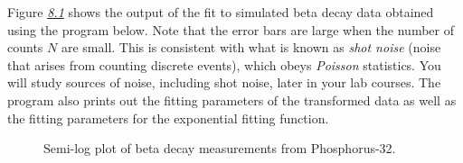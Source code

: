 \documentclass[letterpaper,10pt,english]{sphinxmanual}
\begin{document}
Figure {\hyperref[chap8/chap8_fitting:fig-betadecay]{\emph{8.1}}} shows the output of the fit to simulated beta decay data obtained using the program below.  Note that the error bars are large when the number of counts $N$ are small.  This is consistent with what is known as \emph{shot noise} (noise that arises from counting discrete events), which obeys \emph{Poisson} statistics.  You will study sources of noise, including shot noise, later in your lab courses.  The program also prints out the fitting parameters of the transformed data as well as the fitting parameters for the exponential fitting function.
\begin{figure}[htbp]
\centering
\capstart

\caption{Semi-log plot of beta decay measurements from Phosphorus-32.}\label{chap8/chap8_fitting:fig-betadecay}\end{figure}
\end{document}
